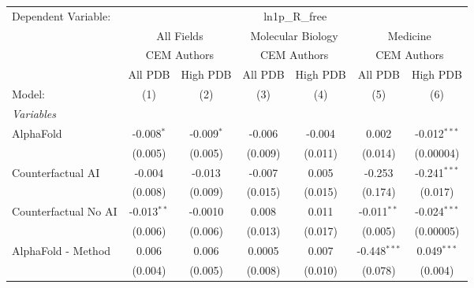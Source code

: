 \begingroup
\centering
\begin{tabular}{lcccccc}
   \tabularnewline \midrule \midrule
   Dependent Variable: & \multicolumn{6}{c}{ln1p\_R\_free}\\
 & \multicolumn{2}{c}{All Fields} & \multicolumn{2}{c}{Molecular Biology} & \multicolumn{2}{c}{Medicine} \\
\cmidrule(lr){2-3} \cmidrule(lr){4-5} \cmidrule(lr){6-7}
 & \multicolumn{2}{c}{CEM Authors} & \multicolumn{2}{c}{CEM Authors} & \multicolumn{2}{c}{CEM Authors} \\
\cmidrule(lr){2-3} \cmidrule(lr){4-5} \cmidrule(lr){6-7}
 & \multicolumn{1}{c}{All PDB} & \multicolumn{1}{c}{High PDB} & \multicolumn{1}{c}{All PDB} & \multicolumn{1}{c}{High PDB} & \multicolumn{1}{c}{All PDB} & \multicolumn{1}{c}{High PDB} \\
\cmidrule(lr){2-2} \cmidrule(lr){3-3} \cmidrule(lr){4-4} \cmidrule(lr){5-5} \cmidrule(lr){6-6} \cmidrule(lr){7-7}
   Model:                                                     & (1)           & (2)           & (3)     & (4)       & (5)            & (6)\\  
   \midrule
   \emph{Variables}\\
   AlphaFold                                                  & -0.008$^{*}$  & -0.009$^{*}$  & -0.006  & -0.004    & 0.002          & -0.012$^{***}$\\   
                                                              & (0.005)       & (0.005)       & (0.009) & (0.011)   & (0.014)        & (0.00004)\\   
   Counterfactual AI                                          & -0.004        & -0.013        & -0.007  & 0.005     & -0.253         & -0.241$^{***}$\\   
                                                              & (0.008)       & (0.009)       & (0.015) & (0.015)   & (0.174)        & (0.017)\\   
   Counterfactual No AI                                       & -0.013$^{**}$ & -0.0010       & 0.008   & 0.011     & -0.011$^{**}$  & -0.024$^{***}$\\   
                                                              & (0.006)       & (0.006)       & (0.013) & (0.017)   & (0.005)        & (0.00005)\\   
   AlphaFold - Method                                         & 0.006         & 0.006         & 0.0005  & 0.007     & -0.448$^{***}$ & 0.049$^{***}$\\   
                                                              & (0.004)       & (0.005)       & (0.008) & (0.010)   & (0.078)        & (0.004)\\   

\end{tabular}
